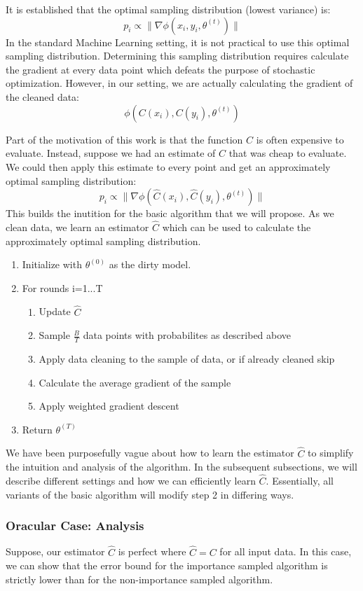 It is established \cite{zhao2014stochastic} that the optimal sampling distribution (lowest variance) is:
\[p_{i}\propto\|\nabla\phi(x_{i},y_{i},\theta^{(t)})\|\]
In the standard Machine Learning setting, it is not practical to use this optimal sampling distribution.
Determining this sampling distribution requires calculate the gradient at every data point which defeats the purpose of stochastic optimization. 
However, in our setting, we are actually calculating the gradient of the cleaned data:
\[\phi(C(x_{i}),C(y_{i}),\theta^{(t)})\]

Part of the motivation of this work is that the function $C$ is often expensive to evaluate.
Instead, suppose we had an estimate of $\hat{C}$ that was cheap to evaluate.
We could then apply this estimate to every point and get an approximately optimal sampling distribution:
\[p_{i}\propto\|\nabla\phi(\hat{C}(x_{i}),\hat{C}(y_{i}),\theta^{(t)})\|\]
This builds the inutition for the basic algorithm that we will propose.
As we clean data, we learn an estimator $\hat{C}$ which can be used to calculate the approximately optimal
sampling distribution.

\begin{enumerate}[noitemsep]
\item Initialize with $\theta^{(0)}$ as the dirty model.
\item For rounds i=1...T
\begin{enumerate}
	\item Update $\hat{C}$
	\item Sample $\frac{B}{T}$ data points with probabilites as described above
	\item Apply data cleaning to the sample of data, or if already cleaned skip
	\item Calculate the average gradient of the sample
	\item Apply weighted gradient descent
\end{enumerate}
\item Return $\theta^{(T)}$
\end{enumerate} 

We have been purposefully vague about how to learn the estimator $\hat{C}$ to simplify the intuition
and analysis of the algorithm.
In the subsequent subsections, we will describe different settings and how we can efficiently learn $\hat{C}$.
Essentially, all variants of the basic algorithm will modify step 2 in differing ways.

\subsubsection{Oracular Case: Analysis}
Suppose, our estimator $\hat{C}$ is perfect where $\hat{C} = C$ for all input data.
In this case, we can show that the error bound for the importance sampled algorithm is strictly lower
than for the non-importance sampled algorithm.

